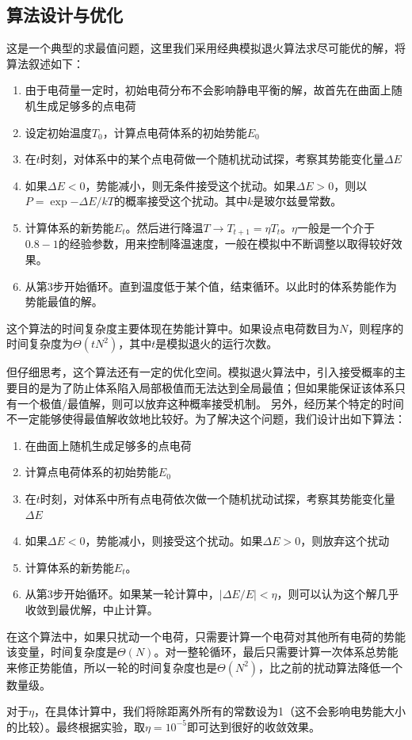 \documentclass[UTF8]{article}
\numberwithin{figure}{subsection}
\numberwithin{table}{subsection}
\begin{document}
\begin{multicols}{2}
    \subsection{算法设计与优化}
    \par 这是一个典型的求最值问题，这里我们采用经典模拟退火算法求尽可能优的解，将算法叙述如下：
    \begin{enumerate}
        \item 由于电荷量一定时，初始电荷分布不会影响静电平衡的解，故首先在曲面上随机生成足够多的点电荷
        \item 设定初始温度$T_0$，计算点电荷体系的初始势能$E_0$
        \item 在$t$时刻，对体系中的某个点电荷做一个随机扰动试探，考察其势能变化量$\Delta E$
        \item 如果$\Delta E<0$，势能减小，则无条件接受这个扰动。如果$\Delta E>0$，则以$P=\exp{-\Delta E/kT}$的概率接受这个扰动。其中$k$是玻尔兹曼常数。
        \item 计算体系的新势能$E_t$。然后进行降温$T\to T_{t+1}=\eta T_t$。$\eta$一般是一个介于$0.8-1$的经验参数，用来控制降温速度，一般在模拟中不断调整以取得较好效果。
        \item 从第3步开始循环。直到温度低于某个值，结束循环。以此时的体系势能作为势能最值的解。
    \end{enumerate}
    这个算法的时间复杂度主要体现在势能计算中。如果设点电荷数目为$N$，则程序的时间复杂度为$\Theta (tN^2)$，其中$t$是模拟退火的运行次数。
    \par 但仔细思考，这个算法还有一定的优化空间。模拟退火算法中，引入接受概率的主要目的是为了防止体系陷入局部极值而无法达到全局最值；但如果能保证该体系只有一个极值/最值解，则可以放弃这种概率接受机制。
    另外，经历某个特定的时间不一定能够使得最值解收敛地比较好。为了解决这个问题，我们设计出如下算法：
    \begin{enumerate}
        \item 在曲面上随机生成足够多的点电荷
        \item 计算点电荷体系的初始势能$E_0$
        \item 在$t$时刻，对体系中所有点电荷依次做一个随机扰动试探，考察其势能变化量$\Delta E$
        \item 如果$\Delta E<0$，势能减小，则接受这个扰动。如果$\Delta E>0$，则放弃这个扰动
        \item 计算体系的新势能$E_t$。
        \item 从第3步开始循环。如果某一轮计算中，$|\Delta E/E|<\eta$，则可以认为这个解几乎收敛到最优解，中止计算。
    \end{enumerate}
    在这个算法中，如果只扰动一个电荷，只需要计算一个电荷对其他所有电荷的势能该变量，时间复杂度是$\Theta (N)$。对一整轮循环，最后只需要计算一次体系总势能来修正势能值，所以一轮的时间复杂度也是$\Theta (N^2)$，比之前的扰动算法降低一个数量级。
    \par 对于$\eta$，在具体计算中，我们将除距离外所有的常数设为1（这不会影响电势能大小的比较）。最终根据实验，取$\eta=10^{-5}$即可达到很好的收敛效果。

\end{multicols}
\end{document}
